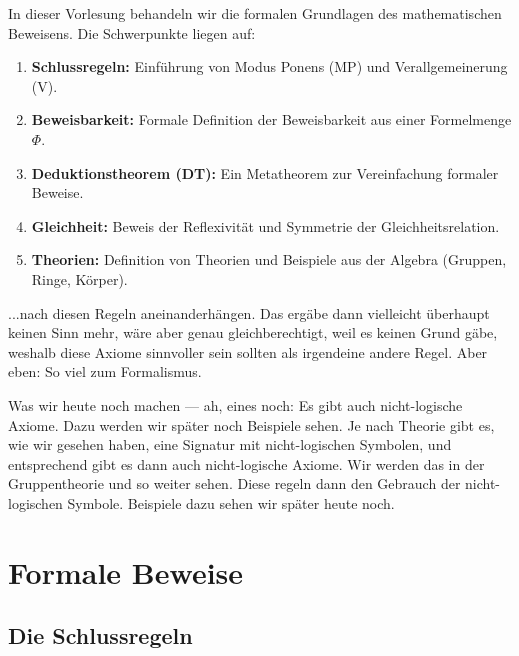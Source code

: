 
\begin{nice-box}
In dieser Vorlesung behandeln wir die formalen Grundlagen des mathematischen Beweisens. Die Schwerpunkte liegen auf:
\begin{enumerate}[label=\textbf{(\arabic*)}]
    \item \textbf{Schlussregeln:} Einführung von Modus Ponens (MP) und Verallgemeinerung (V).
    \item \textbf{Beweisbarkeit:} Formale Definition der Beweisbarkeit aus einer Formelmenge $\Phi$.
    \item \textbf{Deduktionstheorem (DT):} Ein Metatheorem zur Vereinfachung formaler Beweise.
    \item \textbf{Gleichheit:} Beweis der Reflexivität und Symmetrie der Gleichheitsrelation.
    \item \textbf{Theorien:} Definition von Theorien und Beispiele aus der Algebra (Gruppen, Ringe, Körper).
\end{enumerate}
\end{nice-box}

\begin{spoken-clean}[00:09:30 - 00:11:28]
...nach diesen Regeln aneinanderhängen. Das ergäbe dann vielleicht überhaupt keinen Sinn mehr, wäre aber genau gleichberechtigt, weil es keinen Grund gäbe, weshalb diese Axiome sinnvoller sein sollten als irgendeine andere Regel. Aber eben: So viel zum Formalismus.

Was wir heute noch machen --- ah, eines noch: Es gibt auch nicht-logische Axiome. Dazu werden wir später noch Beispiele sehen. Je nach Theorie gibt es, wie wir gesehen haben, eine Signatur mit nicht-logischen Symbolen, und entsprechend gibt es dann auch nicht-logische Axiome. Wir werden das in der Gruppentheorie und so weiter sehen. Diese regeln dann den Gebrauch der nicht-logischen Symbole. Beispiele dazu sehen wir später heute noch.
\end{spoken-clean}

\section{Formale Beweise}
\subsection{Die Schlussregeln}


